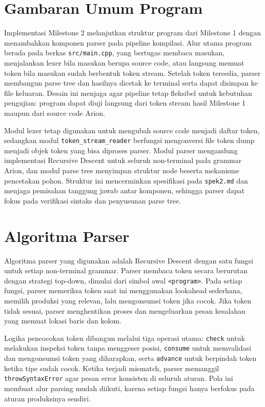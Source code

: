 \section{Gambaran Umum Program}
Implementasi Milestone 2 melanjutkan struktur program dari Milestone 1 dengan 
menambahkan komponen parser pada pipeline kompilasi. Alur utama program berada 
pada berkas \texttt{src/main.cpp}, yang bertugas membaca masukan, menjalankan lexer 
bila masukan berupa source code, atau langsung memuat token bila masukan sudah berbentuk 
token stream. Setelah token tersedia, parser membangun parse tree dan hasilnya dicetak ke 
terminal serta dapat disimpan ke file keluaran. Desain ini menjaga agar pipeline tetap 
fleksibel untuk kebutuhan pengujian: program dapat diuji langsung dari token stream hasil 
Milestone 1 maupun dari source code Arion.

Modul lexer tetap digunakan untuk mengubah source code menjadi daftar token, sedangkan modul
 \texttt{token\_stream\_reader} berfungsi mengonversi file token dump menjadi objek token 
 yang bisa diproses parser. Modul parser mengandung implementasi Recursive Descent untuk 
 seluruh non-terminal pada grammar Arion, dan modul parse tree menyimpan struktur node 
 beserta mekanisme pencetakan pohon. Struktur ini mencerminkan spesifikasi pada \texttt{spek2.md} 
 dan menjaga pemisahan tanggung jawab antar komponen, sehingga parser dapat fokus pada verifikasi 
 sintaks dan penyusunan parse tree.

\section{Algoritma Parser}
Algoritma parser yang digunakan adalah Recursive Descent dengan satu fungsi untuk setiap 
non-terminal grammar. Parser membaca token secara berurutan dengan strategi top-down, 
dimulai dari simbol awal \texttt{<program>}. Pada setiap fungsi, parser memeriksa token saat 
ini menggunakan lookahead sederhana, memilih produksi yang relevan, lalu mengonsumsi token 
jika cocok. Jika token tidak sesuai, parser menghentikan proses dan mengeluarkan pesan kesalahan 
yang memuat lokasi baris dan kolom.

Logika pencocokan token dibangun melalui tiga operasi utama: \texttt{check} untuk melakukan 
inspeksi token tanpa menggeser posisi, \texttt{consume} untuk memvalidasi dan mengonsumsi token 
yang diharapkan, serta \texttt{advance} untuk berpindah token ketika tipe sudah cocok. Ketika 
terjadi mismatch, parser memanggil \texttt{throwSyntaxError} agar pesan error konsisten di seluruh 
aturan. Pola ini membuat alur parsing mudah diikuti, karena setiap fungsi hanya berfokus pada aturan 
produksinya sendiri.

